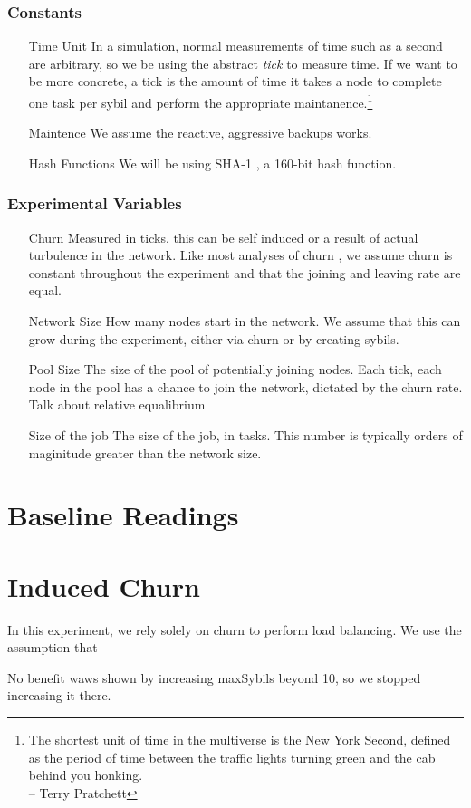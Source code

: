 \subsubsection{Constants}

\begin{enumerate}
	\item[Time Unit] In a simulation, normal measurements of time such as a second are arbitrary, so we be using the abstract \textit{tick} to measure time.  
	If we want to be more concrete, a tick is the amount of time it takes a node to complete one task per sybil and perform the appropriate maintanence.\footnote{The shortest unit of time in the multiverse is the New York Second, defined as the period of time between the traffic lights turning green and the cab behind you honking.\\-- Terry Pratchett}
	\item[Maintence] We assume the reactive, aggressive backups works.
	\item[Hash Functions] We will be using SHA-1 \cite{sha1}, a 160-bit hash function.
\end{enumerate}

\subsubsection{Experimental Variables}
\begin{enumerate}
	\item[Churn] Measured in ticks, this can be self induced or a result of actual turbulence in the network.
	Like most analyses of churn \cite{marozzo2012p2p}, we assume churn is constant throughout the experiment and that the joining and leaving rate are equal.
	\item[Network Size]  How many nodes start in the network.  
		We assume that this can grow during the experiment, either via churn or by creating sybils.
	\item[Pool Size]  The size of the pool of potentially joining nodes.  Each tick, each node in the pool has a chance to join the network, dictated by the churn rate.
		Talk about relative equalibrium
	\item[Size of the job] The size of the job, in tasks.
		This number is typically orders of maginitude greater than the network size.
\end{enumerate}



\section{Baseline Readings}

\section{Induced Churn}
In this experiment, we rely solely on churn to perform load balancing.
We use the assumption that 


No benefit waws shown by increasing maxSybils beyond 10, so we stopped increasing it there.

